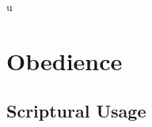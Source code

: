 u%
\section{Obedience}
	\label{OBEDIENCE}
	




	


\subsection{Scriptural Usage} %
	\label{OBEDIENCE-SCRIPTURES}

